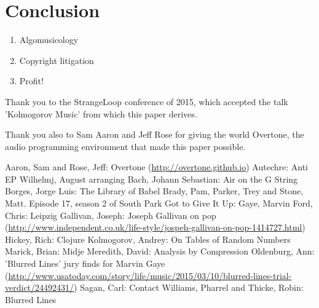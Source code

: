 \documentclass[numbers, preprint]{sigplanconf}
\begin{document}
\section{Conclusion}

\begin{enumerate}
    \item Algomusicology
    \item Copyright litigation
    \item Profit!
\end{enumerate}

\acks

Thank you to the StrangeLoop conference of 2015, which accepted the talk 'Kolmogorov Music' from which this paper derives.

Thank you also to Sam Aaron and Jeff Rose for giving the world Overtone\cite{Overtone}, the audio programming environment
that made this paper possible.




\begin{thebibliography}{}
\softraggedright

 Aaron, Sam and Rose, Jeff: Overtone (\url{http://overtone.github.io})
 Autechre: Anti EP
 Wilhelmj, August arranging Bach, Johann Sebastian: Air on the G String
 Borges, Jorge Luis: The Library of Babel
 Brady, Pam, Parker, Trey and Stone, Matt. Episode 17, season 2 of South Park
 Got to Give It Up: Gaye, Marvin
 Ford, Chris: Leipzig
 Gallivan, Joseph: Joseph Gallivan on pop (\url{http://www.independent.co.uk/life-style/jospeh-gallivan-on-pop-1414727.html})
 Hickey, Rich: Clojure
  Kolmogorov, Andrey: On Tables of Random Numbers
 Marick, Brian: Midje
 Meredith, David: Analysis by Compression
 Oldenburg, Ann: 'Blurred Lines' jury finds for Marvin Gaye (\url{http://www.usatoday.com/story/life/music/2015/03/10/blurred-lines-trial-verdict/24492431/})
 Sagan, Carl: Contact
 Williams, Pharrel and Thicke, Robin: Blurred Lines

\end{thebibliography}
\end{document}
